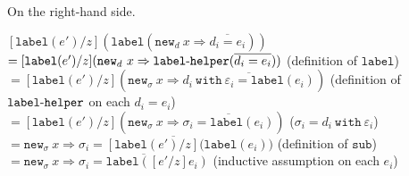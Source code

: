 \documentclass{llncs}
\newcommand{\keywadj}[1]{\mathtt{#1}}
\newcommand{\keyw}[1]{\keywadj{#1}~}
\newcommand{\kw}[1]{\keyw{ #1 }}
\newcommand{\kwa}[1]{\keywadj{ #1 }}
\newcommand{\hyphen}{\hbox{-}}
\begin{document}
{{\noindent
On the right-hand side.
\begin{adjustwidth}{1.5em}{0em}
$[\kwa{label}(e')/z](\kwa{label}(\kwa{new}_d~x \Rightarrow \overline{d_i = e_i}))$ \\
$= [\kwa{label}(e')/z](\kwa{new}_d~x \Rightarrow \kwa{label \hyphen helper}(\overline{d_i = e_i}))$
\tabto{24em} (definition of $\kwa{label}$) \\
$= [\kwa{label}(e')/z](\kwa{new}_\sigma~x \Rightarrow \overline{d_i~\kw{with} \varepsilon_i = \kwa{label}(e_i)})$
\tabto{24em} (definition of $\kwa{label \hyphen helper}$ on each $d_i = e_i$) \\
$= [\kwa{label}(e')/z](\kwa{new}_\sigma~x \Rightarrow \overline{\sigma_i = \kwa{label}(e_i)})$
\tabto{24em} ($\sigma_i = d_i~\kw{with} \varepsilon_i$) \\
$= \kwa{new}_\sigma~x \Rightarrow \overline{\sigma_i = [\kwa{label}(e')/z](\kwa{label}(e_i)})$
\tabto{24em} (definition of $\kwa{sub}$) \\
$= \kwa{new}_\sigma~x \Rightarrow \overline{\sigma_i = \kwa{label}([e'/z]e_i)}$
\tabto{24em} (inductive assumption on each $e_i$)
\end{adjustwidth}~
}
}
\end{document}
